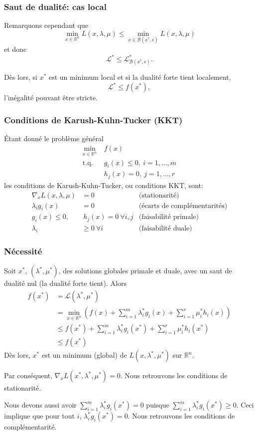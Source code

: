 \documentclass[usepdftitle=false]{beamer}
\def\cB{\mathcal{B}}
\def\cL{\mathcal{L}}
\def\RR{\mathbb{R}}
\begin{document}
\begin{frame}
\frametitle{Saut de dualité: cas local}

Remarquons cependant que
$$
\min_{x \in \mathbb{R}^n} L(x, \lambda, \mu) 
\leq \min_{x \in \cB(x^*, \epsilon)} L(x, \lambda, \mu) 
$$
et donc
$$
\cL^* \leq \cL^*_{\cB(x^*, \epsilon)}.
$$

\mbox{}

Dès lors, si $x^*$ est un minimum local et si la dualité forte tient localement,
$$
\cL^* \leq f(x^*),
$$
l'inégalité pouvant être stricte.

\end{frame}

\begin{frame}
\frametitle{Conditions de Karush-Kuhn-Tucker (KKT)}

Étant donné le problème général
\begin{align*}
\min_{x \in \mathbb{R}^n} \ & f(x) \\
\mbox{t.q. } & g_i(x) \leq 0,\ i = 1,\ldots,m \\
& h_j(x) = 0,\ j = 1,\ldots,r
\end{align*}
les conditions de Karush-Kuhn-Tucker, ou conditions KKT, sont:
\begin{align*}
\nabla_x L(x,\lambda,\mu) &= 0 & \mbox{(stationarité)}\\
\lambda_i g_i(x) &= 0 & \mbox{(écarts de complémentarités)} \\
g_i(x) \leq 0, &\ h_j(x) = 0\ \forall i,j & \mbox{(faisabilité primale)} \\
\lambda_i &\geq 0\ \forall i & \mbox{(faisabilité duale)}
\end{align*}



\end{frame}

\begin{frame}
\frametitle{Nécessité}

Soit $x^*$, $(\lambda^*, \mu^*)$, des solutions globales primale et duale, avec un saut de dualité nul (la dualité forte tient).
Alors
\begin{align*}
f(x^*) &= \cL(\lambda^*, \mu^*) \\
&= \min_{x \in \RR^n} \left( f(x) + \sum_{i = 1}^m \lambda_i^* g_i(x) + \sum_{i = 1}^r \mu_i^* h_i(x) \right) \\
& \leq f(x^*) + \sum_{i = 1}^m \lambda_i^* g_i(x^*) + \sum_{i = 1}^r \mu_i^* h_i(x^*) \\
& \leq f(x^*)
\end{align*}
Dès lors, $x^*$ est un minimum (global) de $L(x, \lambda^*, \mu^*)$ sur $\RR^n$.

Par conséquent, $\nabla_x L(x^*, \lambda^*, \mu^*) = 0$.
Nous retrouvons les conditions de stationarité.

Nous devons aussi avoir $\sum_{i = 1}^m \lambda_i^* g_i(x^*) = 0$ puisque $\sum_{i = 1}^m \lambda_i^* g_i(x^*) \geq 0$.
Ceci implique que pour tout $i$, $\lambda_i^* g_i(x^*) = 0$.
Nous retrouvons les conditions de complémentarité.

\end{frame}
\end{document}
